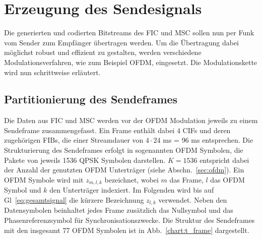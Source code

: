 \section{Erzeugung des Sendesignals}
\label{sec:ofdm_mod}
Die generierten und codierten Bitstreams des FIC und MSC sollen nun per Funk vom Sender zum Empfänger übertragen werden. Um die Übertragung dabei möglichst robust und effizient zu gestalten, werden verschiedene Modulationsverfahren, wie zum Beispiel \ac{OFDM}, eingesetzt. Die Modulationskette wird nun schrittweise erläutert.

\subsection{Partitionierung des Sendeframes}
\label{sec:transmission_frame}
Die Daten aus FIC und MSC werden vor der OFDM Modulation jeweils zu einem Sendeframe zusammengefasst. Ein Frame enthält dabei $4$ CIFs und deren zugehörigen FIBs, die einer Streamdauer von $4\cdot24$ ms = 96 ms entsprechen. Die Strukturierung des Sendeframes erfolgt in sogenannten OFDM Symbolen, die Pakete von jeweils 1536 QPSK Symbolen darstellen. $K=1536$ entspricht dabei der Anzahl der genutzten OFDM Unterträger (siehe Abschn.~\ref{sec:ofdm}). Ein OFDM Symbole wird mit $z_{m,l,k}$ bezeichnet, wobei $m$ das Frame, $l$ das OFDM Symbol und $k$ den Unterträger indexiert. Im Folgenden wird bis auf Gl~\ref{eq:gesamtsignal} die kürzere Bezeichnung $z_{l,k}$ verwendet. Neben den Datensymbolen beinhaltet jedes Frame zusätzlich das Nullsymbol und das Phasenreferenzsymbol für Synchronisationszwecke. Die Struktur des Sendeframes mit den insgesamt 77 OFDM Symbolen ist in Abb.~\ref{chart:t_frame} dargestellt.

